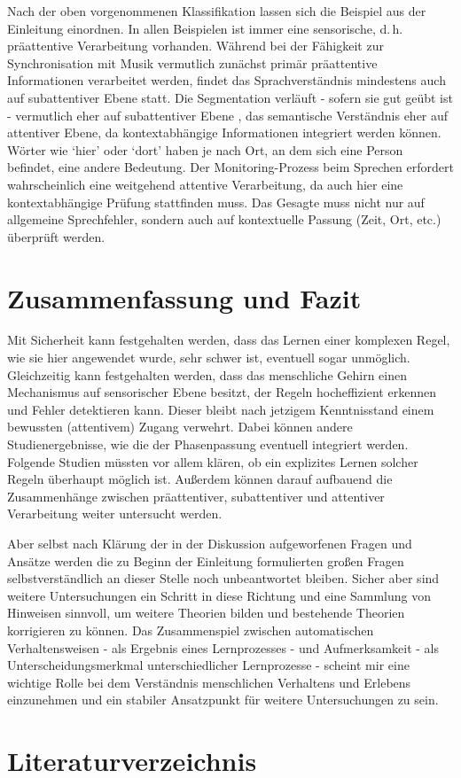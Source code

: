 \documentclass[doc,a4paper,12pt]{apa6}
\begin{document}
Nach der oben vorgenommenen Klassifikation lassen sich die Beispiel aus der Einleitung einordnen. In allen Beispielen ist immer eine sensorische, d.\,h. präattentive Verarbeitung vorhanden. Während bei der Fähigkeit zur Synchronisation mit Musik vermutlich zunächst primär präattentive Informationen verarbeitet werden, findet das Sprachverständnis mindestens auch auf subattentiver Ebene statt. Die Segmentation verläuft - sofern sie gut geübt ist - vermutlich eher auf subattentiver Ebene \parencite{sanders2002segmenting}, das semantische Verständnis eher auf attentiver Ebene, da kontextabhängige Informationen integriert werden können. Wörter wie `hier' oder `dort' haben je nach Ort, an dem sich eine Person befindet, eine andere Bedeutung. Der Monitoring-Prozess \parencites{levelt1983monitoring,postma2000detection} beim Sprechen erfordert wahrscheinlich eine weitgehend attentive Verarbeitung, da auch hier eine kontextabhängige Prüfung stattfinden muss. Das Gesagte muss nicht nur auf allgemeine Sprechfehler, sondern auch auf kontextuelle Passung (Zeit, Ort, etc.) überprüft werden.

\section{Zusammenfassung und Fazit}

Mit Sicherheit kann festgehalten werden, dass das Lernen einer komplexen Regel, wie sie hier angewendet wurde, sehr schwer ist, eventuell sogar unmöglich. Gleichzeitig kann festgehalten werden, dass das menschliche Gehirn einen Mechanismus auf sensorischer Ebene besitzt, der Regeln hocheffizient erkennen und Fehler detektieren kann. Dieser bleibt nach jetzigem Kenntnisstand einem bewussten (attentivem) Zugang verwehrt. Dabei können andere Studienergebnisse, wie die der Phasenpassung eventuell integriert werden. Folgende Studien müssten vor allem klären, ob ein explizites Lernen solcher Regeln überhaupt möglich ist. Außerdem können darauf aufbauend die Zusammenhänge zwischen präattentiver, subattentiver und attentiver Verarbeitung weiter untersucht werden.

Aber selbst nach Klärung der in der Diskussion aufgeworfenen Fragen und Ansätze werden die zu Beginn der Einleitung formulierten großen Fragen selbstverständlich an dieser Stelle noch unbeantwortet bleiben. Sicher aber sind weitere Untersuchungen ein Schritt in diese Richtung und eine Sammlung von Hinweisen sinnvoll, um weitere Theorien bilden und bestehende Theorien korrigieren zu können. Das Zusammenspiel zwischen automatischen Verhaltensweisen - als Ergebnis eines Lernprozesses - und Aufmerksamkeit - als Unterscheidungsmerkmal unterschiedlicher Lernprozesse - scheint mir eine wichtige Rolle bei dem Verständnis menschlichen Verhaltens und Erlebens einzunehmen und ein stabiler Ansatzpunkt für weitere Untersuchungen zu sein.


\section{Literaturverzeichnis}

\printbibliography[heading=none]
\end{document}
